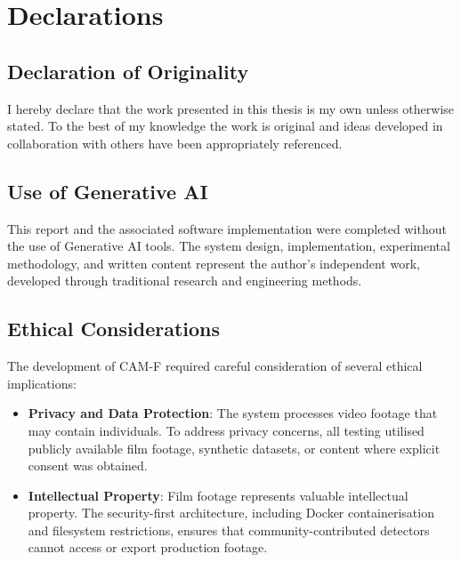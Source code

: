 \chapter*{Declarations}

\section*{Declaration of Originality}

I hereby declare that the work presented in this thesis is my own unless otherwise stated. To the best of my knowledge the work is original and ideas developed in collaboration with others have been appropriately referenced.

\section*{Use of Generative AI}

This report and the associated software implementation were completed without the use of Generative AI tools. The system design, implementation, experimental methodology, and written content represent the author's independent work, developed through traditional research and engineering methods.

\section*{Ethical Considerations}

The development of CAM-F required careful consideration of several ethical implications:

\begin{itemize}
    \item \textbf{Privacy and Data Protection}: The system processes video footage that may contain individuals. To address privacy concerns, all testing utilised publicly available film footage, synthetic datasets, or content where explicit consent was obtained. 
    
    \item \textbf{Intellectual Property}: Film footage represents valuable intellectual property. The security-first architecture, including Docker containerisation and filesystem restrictions, ensures that community-contributed detectors cannot access or export production footage. 
    
\end{itemize}

